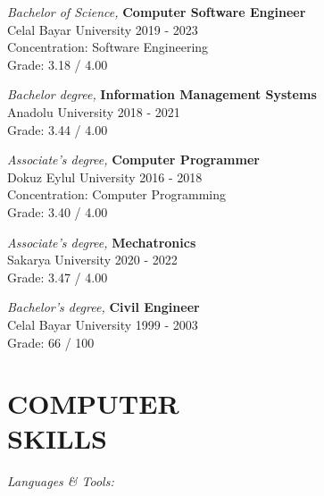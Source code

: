\documentclass[line,margin]{res}
\begin{document}
\begin{resume}
                {\sl Bachelor of Science,} \textbf{Computer Software Engineer} \\
                Celal Bayar University 
                2019 - 2023 \\
                Concentration: Software Engineering \\
                Grade: 3.18 / 4.00 
                
                {\sl Bachelor degree,} \textbf{Information Management Systems} \\
                Anadolu University 
                2018 - 2021 \\
                Grade: 3.44 / 4.00 

                {\sl Associate's degree,} \textbf{Computer Programmer} \\
                Dokuz Eylul University 
                2016 - 2018 \\
                Concentration: Computer Programming \\
                Grade: 3.40 / 4.00 
 
                {\sl Associate's degree,} \textbf{Mechatronics} \\
                Sakarya University 
                2020 - 2022 \\
                Grade: 3.47 / 4.00 

                {\sl Bachelor's degree,} \textbf{Civil Engineer} \\
                Celal Bayar University 
                1999 - 2003 \\
                Grade: 66 / 100 
 
\section{COMPUTER \\ SKILLS} {\sl Languages \& Tools:} \\
                

\end{resume}
\end{document}
